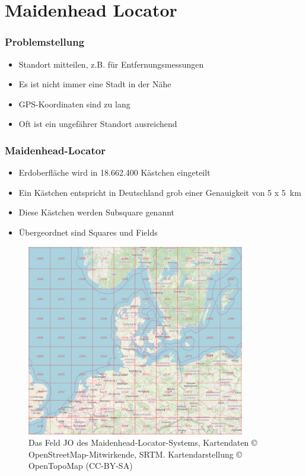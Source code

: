 
\section{Maidenhead Locator}
\label{section:locator}
\begin{frame}%

\frametitle{Problemstellung}
\begin{itemize}
  \item Standort mitteilen, z.B. für Entfernungsmessungen
  \item Es ist nicht immer eine Stadt in der Nähe
  \item GPS-Koordinaten sind zu lang
  \item Oft ist ein ungefährer Standort ausreichend
  \end{itemize}
\end{frame}

\begin{frame}
\frametitle{Maidenhead-Locator}
\begin{itemize}
  \item Erdoberfläche wird in 18.662.400 Kästchen eingeteilt
  \item Ein Kästchen entspricht in Deutschland grob einer Genauigkeit von 5 x \qty{5}{\kilo\metre}
  \item Diese Kästchen werden Subsquare genannt
  \item Übergeordnet sind Squares und Fields
  \end{itemize}

\end{frame}

\begin{frame}
\begin{figure}
    \includegraphics[width=0.85\textwidth]{foto/2}
    \caption{\scriptsize Das Feld JO des Maidenhead-Locator-Systems, Kartendaten © OpenStreetMap-Mitwirkende, SRTM. Kartendarstellung © OpenTopoMap (CC-BY-SA)}
    \label{n_locator_jo}
\end{figure}

\end{frame}

